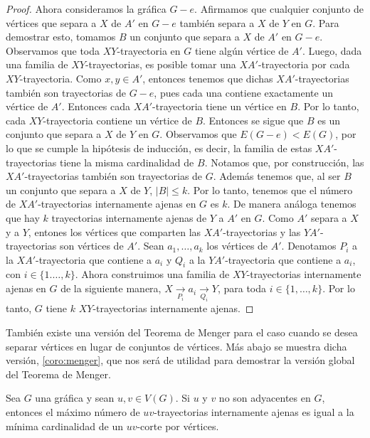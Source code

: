 \begin{proof}
    Ahora consideramos la gr\'afica $G-e$. Afirmamos que cualquier conjunto de
    v\'ertices que separa a $X$ de $A'$ en $G-e$ tambi\'en separa a $X$ de $Y$
    en $G$. Para demostrar esto, tomamos $B$ un conjunto que separa a $X$ de
    $A'$ en $G-e$. Observamos que toda $XY$-trayectoria en $G$ tiene alg\'un
    v\'ertice de $A'$. Luego, dada una familia de $XY$-trayectorias, es posible
    tomar una $XA'$-trayectoria por cada $XY$-trayectoria. Como $x,y \in A'$,
    entonces tenemos que dichas $XA'$-trayectorias tambi\'en son trayectorias de
    $G-e$, pues cada una contiene exactamente un v\'ertice de $A'$. Entonces
    cada $XA'$-trayectoria tiene un v\'ertice en $B$. Por lo tanto, cada
    $XY$-trayectoria contiene un v\'ertice de $B$. Entonces se sigue que $B$ es
    un conjunto que separa a $X$ de $Y$ en $G$. Observamos que $E(G-e)<E(G)$,
    por lo que se cumple la hip\'otesis de inducci\'on, es decir, la familia de
    estas $XA'$-trayectorias tiene la misma cardinalidad de $B$. Notamos que,
    por construcci\'on, las $XA'$-trayectorias tambi\'en son trayectorias de
    $G$. Adem\'as tenemos que, al ser $B$ un conjunto que separa a $X$ de $Y$,
    $|B| \leq k$. Por lo tanto, tenemos que el n\'umero de $XA'$-trayectorias
    internamente ajenas en $G$ es $k$. De manera an\'aloga tenemos que hay $k$
    trayectorias internamente ajenas de $Y$ a $A'$ en $G$. Como $A'$ separa a
    $X$ y a $Y$, entones los v\'ertices que comparten las $XA'$-trayectorias y
    las $YA'$-trayectorias son v\'ertices de $A'$. Sean $a_1, \dots, a_k$ los
    v\'ertices de $A'$. Denotamos $P_i$ a la $XA'$-trayectoria que contiene a
    $a_i$ y $Q_i$ a la $YA'$-trayectoria que contiene a $a_i$, con $i \in \{1.
    \dots, k\}$. Ahora construimos una familia de $XY$-trayectorias internamente
    ajenas en $G$ de la siguiente manera, $X \xrightarrow[P_i]{} a_i
    \xrightarrow[Q_i]{} Y$, para toda $i \in \{1, \dots, k\}$. Por lo tanto, $G$
    tiene $k$ $XY$-trayectorias internamente ajenas. 
\end{proof}

 Tambi\'en existe una versi\'on del Teorema de Menger para el caso cuando se
 desea separar v\'ertices en lugar de conjuntos de v\'ertices. M\'as abajo se
 muestra dicha versi\'on, \cref{coro:menger}, que nos ser\'a de utilidad para
 demostrar la versi\'on global del Teorema de Menger.

 \begin{corolario}
    \label{coro:menger}
    Sea $G$ una gr\'afica y sean $u, v \in V(G)$. Si $u$ y $v$ no son adyacentes
    en $G$, entonces el m\'aximo n\'umero de $uv$-trayectorias internamente
    ajenas es igual a la m\'inima cardinalidad de un $uv$-corte por v\'ertices.
\end{corolario}

